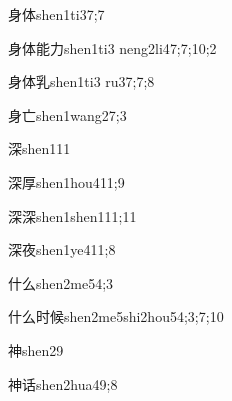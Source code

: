 \begin{verbete}{身体}{shen1ti3}{7;7}
\end{verbete}

\begin{verbete}{身体能力}{shen1ti3 neng2li4}{7;7;10;2}
\end{verbete}

\begin{verbete}{身体乳}{shen1ti3 ru3}{7;7;8}
\end{verbete}

\begin{verbete}{身亡}{shen1wang2}{7;3}
\end{verbete}

\begin{verbete}{深}{shen1}{11}
\end{verbete}

\begin{verbete}{深厚}{shen1hou4}{11;9}
\end{verbete}

\begin{verbete}{深深}{shen1shen1}{11;11}
\end{verbete}

\begin{verbete}{深夜}{shen1ye4}{11;8}
\end{verbete}

\begin{verbete}{什么}{shen2me5}{4;3}
\end{verbete}

\begin{verbete}{什么时候}{shen2me5shi2hou5}{4;3;7;10}
\end{verbete}

\begin{verbete}{神}{shen2}{9}
\end{verbete}

\begin{verbete}{神话}{shen2hua4}{9;8}
\end{verbete}

